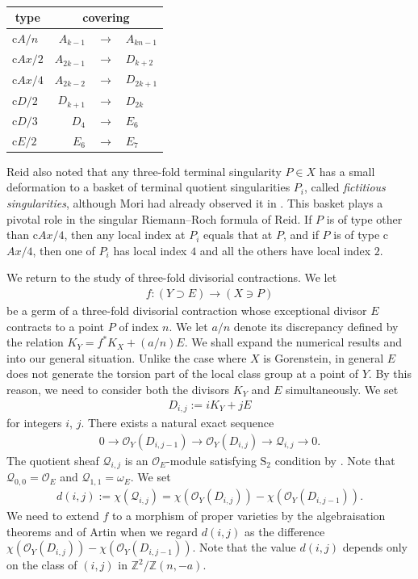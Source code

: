 \documentclass[a4paper,11pt]{amsart}
\theoremstyle{definition}
\theoremstyle{remark}
\numberwithin{equation}{section}
\newcommand{\bZ}{{\mathbb Z}}
\newcommand{\cO}{{\mathcal O}}
\newcommand{\cQ}{{\mathcal Q}}
\begin{document}
\begin{table}[ht]
\caption{}\label{tbl:reproduce}
\begin{tabular}{l|rcl}
\hline
\multicolumn{1}{c|}{type} &
\multicolumn{3}{c}{covering} \\
\hline
c$A/n$  & $A_{k-1}$  & $\to$ & $A_{kn-1}$ \\
c$Ax/2$ & $A_{2k-1}$ & $\to$ & $D_{k+2}$  \\
c$Ax/4$ & $A_{2k-2}$ & $\to$ & $D_{2k+1}$ \\
c$D/2$  & $D_{k+1}$  & $\to$ & $D_{2k}$   \\
c$D/3$  & $D_4$      & $\to$ & $E_6$      \\
c$E/2$  & $E_6$      & $\to$ & $E_7$      \\
\hline
\end{tabular}
\end{table}

Reid also noted that
any three-fold terminal singularity $P \in X$ has a small deformation
to a basket of terminal quotient singularities $P_i$,
called \textit{fictitious singularities},
although Mori had already observed it in \cite{Mo85}.
This basket plays a pivotal role
in the singular Riemann--Roch formula \cite[Theorem 10.2]{Re87} of Reid.
If $P$ is of type other than c$Ax/4$,
then any local index at $P_i$ equals that at $P$,
and if $P$ is of type c$Ax/4$,
then one of $P_i$ has local index $4$ and all the others have local index $2$.

We return to the study of three-fold divisorial contractions.
We let
\begin{align*}
f \colon (Y \supset E) \to (X \ni P)
\end{align*}
be a germ of a three-fold divisorial contraction
whose exceptional divisor $E$ contracts to a point $P$ of index $n$.
We let $a/n$ denote its discrepancy
defined by the relation $K_Y=f^*K_X+(a/n)E$.
We shall expand the numerical results
\cite[Section 4]{Ka01} and \cite[Section 2]{Ka03} into our general situation.
Unlike the case where $X$ is Gorenstein,
in general $E$ does not generate
the torsion part of the local class group at a point of $Y$.
By this reason,
we need to consider both the divisors $K_Y$ and $E$ simultaneously.
We set
\begin{align}\label{eqn:definition_D}
D_{i,j}:=iK_Y+jE
\end{align}
for integers $i$, $j$.
There exists a natural exact sequence
\begin{align}\label{eqn:exact_sequence}
0 \to \cO_Y(D_{i,j-1}) \to \cO_Y(D_{i,j}) \to \cQ_{i,j} \to 0.
\end{align}
The quotient sheaf $\cQ_{i,j}$ is an $\cO_E$-module
satisfying $\mathrm{S}_2$ condition by \cite[Proposition 5.26]{KM98}.
Note that $\cQ_{0,0}=\cO_E$ and $\cQ_{1,1}=\omega_E$.
We set
\begin{align*}
d(i,j):= \chi(\cQ_{i,j})=\chi(\cO_Y(D_{i,j}))-\chi(\cO_Y(D_{i,j-1})).
\end{align*}
We need to extend $f$ to a morphism of proper varieties
by the algebraisation theorems \cite{Ar68} and \cite{Ar69} of Artin
when we regard $d(i, j)$ as the difference
$\chi(\cO_Y(D_{i,j}))-\chi(\cO_Y(D_{i,j-1}))$.
Note that the value $d(i,j)$ depends only on
the class of $(i,j)$ in $\bZ^2/\bZ(n, -a)$.
\end{document}
